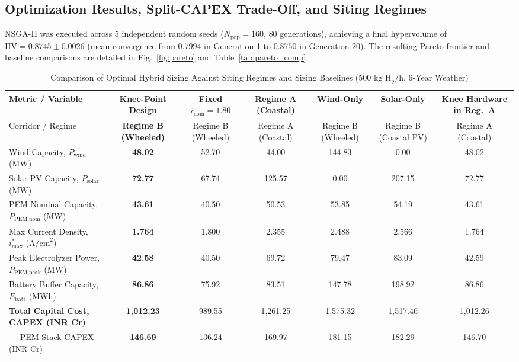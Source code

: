 \documentclass[conference]{IEEEtran}
\begin{document}
\subsection{Optimization Results, Split-CAPEX Trade-Off, and Siting Regimes}
NSGA-II was executed across $5$ independent random seeds ($N_{\text{pop}} = 160$, $80$ generations), achieving a final hypervolume of $\text{HV} = 0.8745 \pm 0.0026$ (mean convergence from $0.7994$ in Generation 1 to $0.8750$ in Generation 20). The resulting Pareto frontier and baseline comparisons are detailed in Fig.~\ref{fig:pareto} and Table~\ref{tab:pareto_comp}.

\begin{table}[t]
\caption{Comparison of Optimal Hybrid Sizing Against Siting Regimes and Sizing Baselines ($500\text{ kg H}_2/\text{h}$, 6-Year Weather)}
\begin{center}
\begin{tabular}{lcccccc}
\toprule
Metric / Variable & \textbf{Knee-Point Design} & \textbf{Fixed $i_{\text{nom}} = 1.80$} & \textbf{Regime A (Coastal)} & \textbf{Wind-Only} & \textbf{Solar-Only} & \textbf{Knee Hardware in Reg.\ A} \\
\midrule
Corridor / Regime & \textbf{Regime B (Wheeled)} & Regime B (Wheeled) & Regime A (Coastal) & Regime B (Wheeled) & Regime B (Coastal PV) & Regime A (Coastal) \\
Wind Capacity, $P_{\text{wind}}$ (MW) & \textbf{48.02} & 52.70 & 44.00 & 144.83 & 0.00 & 48.02 \\
Solar PV Capacity, $P_{\text{solar}}$ (MW) & \textbf{72.77} & 67.74 & 125.57 & 0.00 & 207.15 & 72.77 \\
PEM Nominal Capacity, $P_{\text{PEM,nom}}$ (MW) & \textbf{43.61} & 40.50 & 50.53 & 53.85 & 54.19 & 43.61 \\
Max Current Density, $i_{\max}^*$ ($\text{A/cm}^2$) & \textbf{1.764} & 1.800 & 2.355 & 2.488 & 2.566 & 1.764 \\
Peak Electrolyzer Power, $P_{\text{PEM,peak}}$ (MW) & \textbf{42.58} & 40.50 & 69.72 & 79.47 & 83.09 & 42.59 \\
Battery Buffer Capacity, $E_{\text{batt}}$ (MWh) & \textbf{86.86} & 75.92 & 83.51 & 147.78 & 198.92 & 86.86 \\
\midrule
\textbf{Total Capital Cost, CAPEX (INR Cr)} & \textbf{1,012.23} & 989.55 & 1,261.25 & 1,575.32 & 1,517.46 & 1,012.26 \\
--- PEM Stack CAPEX (INR Cr) & \textbf{146.69} & 136.24 & 169.97 & 181.15 & 182.29 & 146.70 \\

\end{tabular}
\end{center}
\end{table}
\end{document}
